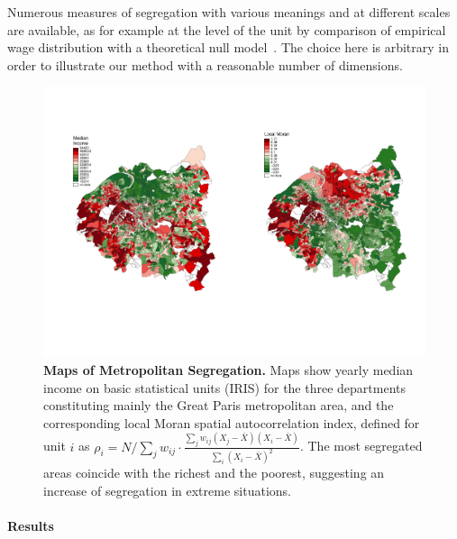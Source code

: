 \documentclass[runningheads,a4paper]{llncs2e/llncs}
\begin{document}
Numerous measures of segregation with various meanings and at different scales are available, as for example at the level of the unit by comparison of empirical wage distribution with a theoretical null model~\cite{louf2015patterns}. The choice here is arbitrary in order to illustrate our method with a reasonable number of dimensions.



\begin{figure}[h!]
\centering
\hspace{-3cm}\includegraphics[width=1.2\textwidth]{figures/grandParis_income_moran}\hspace{-2cm}
\vspace{-2.5cm}
\caption{\textbf{Maps of Metropolitan Segregation.} Maps show yearly median income on basic statistical units (IRIS) for the three departments constituting mainly the Great Paris metropolitan area, and the corresponding local Moran spatial autocorrelation index, defined for unit $i$ as $\rho_i = N/\sum_{j}w_{ij} \cdot \frac{\sum_{j} w_{ij} (X_j - \bar{X})(X_i - \bar{X})}{\sum_i (X_i - \bar{X})^2}$. The most segregated areas coincide with the richest and the poorest, suggesting an increase of segregation in extreme situations.}
\end{figure}

\paragraph{Results}
\end{document}
